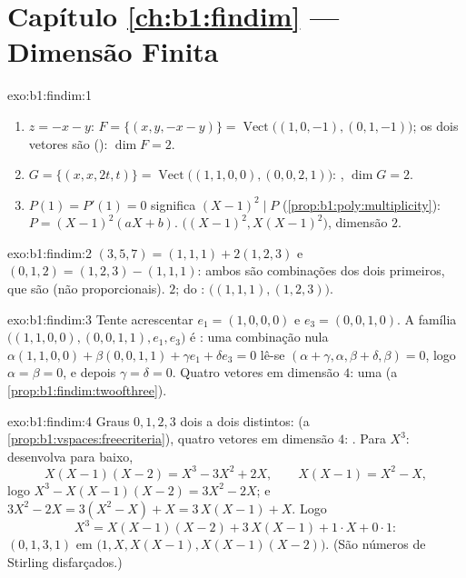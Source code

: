 \section*{Capítulo \ref{ch:b1:findim} --- Dimensão Finita}

\begin{solution}{exo:b1:findim:1}
\begin{enumerate}
  \item $z = -x - y$: $F = \{(x, y, -x-y)\} =
        \operatorname{Vect}\bigl((1,0,-1), (0,1,-1)\bigr)$; os dois
        vetores são  (): $\dim F = 2$.
  \item $G = \{(x, x, 2t, t)\} =
        \operatorname{Vect}\bigl((1,1,0,0), (0,0,2,1)\bigr)$: , $\dim G = 2$.
  \item $P(1) = P'(1) = 0$ significa $(X-1)^2 \mid P$
        (\cref{prop:b1:poly:multiplicity}): $P = (X-1)^2(aX + b)$.
         $\bigl((X-1)^2, X(X-1)^2\bigr)$, dimensão $2$.
\end{enumerate}
\end{solution}

\begin{solution}{exo:b1:findim:2}
$(3,5,7) = (1,1,1) + 2(1,2,3)$ e $(0,1,2) = (1,2,3) - (1,1,1)$: ambos são combinações dos dois primeiros, que são
 (não proporcionais).  $2$;  do :
$\bigl((1,1,1), (1,2,3)\bigr)$.
\end{solution}

\begin{solution}{exo:b1:findim:3}
Tente acrescentar $e_1 = (1,0,0,0)$ e $e_3 = (0,0,1,0)$. A família $\bigl((1,1,0,0), (0,0,1,1), e_1, e_3\bigr)$ é : uma
combinação nula $\alpha(1,1,0,0) + \beta(0,0,1,1) + \gamma e_1 + \delta
e_3 = 0$ lê-se $(\alpha + \gamma, \alpha, \beta + \delta, \beta) =
0$, logo $\alpha = \beta = 0$, e depois $\gamma = \delta = 0$.
Quatro vetores  em dimensão $4$: uma  (a \cref{prop:b1:findim:twoofthree}).
\end{solution}

\begin{solution}{exo:b1:findim:4}
Graus $0, 1, 2, 3$ dois a dois distintos:  (a \cref{prop:b1:vspaces:freecriteria}), quatro
vetores em dimensão $4$: . Para $X^3$: desenvolva para baixo,
\[
X(X-1)(X-2) = X^3 - 3X^2 + 2X,
\qquad
X(X-1) = X^2 - X,
\]
logo $X^3 - X(X-1)(X-2) = 3X^2 - 2X$; e $3X^2 - 2X = 3(X^2 - X) + X
= 3\,X(X-1) + X$. Logo
\[
X^3 = X(X-1)(X-2) + 3\,X(X-1) + 1\cdot X + 0\cdot 1 :
\]
 $(0, 1, 3, 1)$ em $\bigl(1, X, X(X-1),
X(X-1)(X-2)\bigr)$. (São números de Stirling disfarçados.)
\end{solution}

